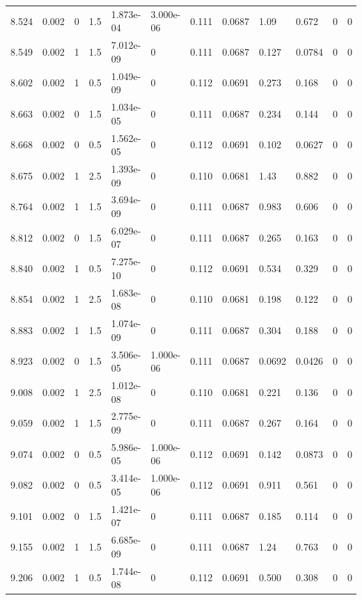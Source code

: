 \documentclass[preview]{standalone}
\begin{document}
{{{{{\begin{tabular}{L{1.2cm}C{1.2cm} C{0.3cm}C{0.5cm} C{1.4cm}C{1.4cm} C{1.4cm}C{1.4cm} C{1.6cm}C{1.6cm} C{1.6cm}C{1.6cm}}
  8.524  &  0.002  & 0     & 1.5 &  1.873e-04  & 3.000e-06  &  0.111&   0.0687& 1.09 & 0.672   &  0 & 0  \\ 
  8.549  &  0.002  & 1     & 1.5 &  7.012e-09  & 0  &  0.111&   0.0687& 0.127 & 0.0784   &  0 & 0  \\ 
  8.602  &  0.002  & 1     & 0.5 &  1.049e-09  & 0  &  0.112&   0.0691& 0.273 & 0.168   &  0 & 0  \\ 
  8.663  &  0.002  & 0     & 1.5 &  1.034e-05  & 0  &  0.111&   0.0687& 0.234 & 0.144   &  0 & 0  \\ 
  8.668  &  0.002  & 0     & 0.5 &  1.562e-05  & 0  &  0.112&   0.0691& 0.102 & 0.0627   &  0 & 0  \\ 
  8.675  &  0.002  & 1     & 2.5 &  1.393e-09  & 0  &  0.110&   0.0681& 1.43 & 0.882   &  0 & 0  \\ 
  8.764  &  0.002  & 1     & 1.5 &  3.694e-09  & 0  &  0.111&   0.0687& 0.983 & 0.606   &  0 & 0  \\ 
  8.812  &  0.002  & 0     & 1.5 &  6.029e-07  & 0  &  0.111&   0.0687& 0.265 & 0.163   &  0 & 0  \\ 
  8.840  &  0.002  & 1     & 0.5 &  7.275e-10  & 0  &  0.112&   0.0691& 0.534 & 0.329   &  0 & 0  \\ 
  8.854  &  0.002  & 1     & 2.5 &  1.683e-08  & 0  &  0.110&   0.0681& 0.198 & 0.122   &  0 & 0  \\ 
  8.883  &  0.002  & 1     & 1.5 &  1.074e-09  & 0  &  0.111&   0.0687& 0.304 & 0.188   &  0 & 0  \\ 
  8.923  &  0.002  & 0     & 1.5 &  3.506e-05  & 1.000e-06  &  0.111&   0.0687& 0.0692 & 0.0426   &  0 & 0  \\ 
  9.008  &  0.002  & 1     & 2.5 &  1.012e-08  & 0  &  0.110&   0.0681& 0.221 & 0.136   &  0 & 0  \\ 
  9.059  &  0.002  & 1     & 1.5 &  2.775e-09  & 0  &  0.111&   0.0687& 0.267 & 0.164   &  0 & 0  \\ 
  9.074  &  0.002  & 0     & 0.5 &  5.986e-05  & 1.000e-06  &  0.112&   0.0691& 0.142 & 0.0873   &  0 & 0  \\ 
  9.082  &  0.002  & 0     & 0.5 &  3.414e-05  & 1.000e-06  &  0.112&   0.0691& 0.911 & 0.561   &  0 & 0  \\ 
  9.101  &  0.002  & 0     & 1.5 &  1.421e-07  & 0  &  0.111&   0.0687& 0.185 & 0.114   &  0 & 0  \\ 
  9.155  &  0.002  & 1     & 1.5 &  6.685e-09  & 0  &  0.111&   0.0687& 1.24 & 0.763   &  0 & 0  \\ 
  9.206  &  0.002  & 1     & 0.5 &  1.744e-08  & 0  &  0.112&   0.0691& 0.500 & 0.308   &  0 & 0  \\ 

\end{tabular}}}}}}
\end{document}
